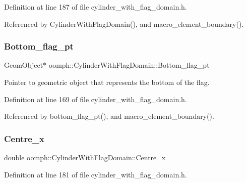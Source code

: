 Definition at line 187 of file cylinder\+\_\+with\+\_\+flag\+\_\+domain.\+h.



Referenced by Cylinder\+With\+Flag\+Domain(), and macro\+\_\+element\+\_\+boundary().

\mbox{\label{classoomph_1_1CylinderWithFlagDomain_ae4bfb961e03aab16d01fc4662c0214e3}} 
\subsubsection{\texorpdfstring{Bottom\+\_\+flag\+\_\+pt}{Bottom\_flag\_pt}}
{\footnotesize\ttfamily Geom\+Object$\ast$ oomph\+::\+Cylinder\+With\+Flag\+Domain\+::\+Bottom\+\_\+flag\+\_\+pt\hspace{0.3cm}{\ttfamily [private]}}



Pointer to geometric object that represents the bottom of the flag. 



Definition at line 169 of file cylinder\+\_\+with\+\_\+flag\+\_\+domain.\+h.



Referenced by bottom\+\_\+flag\+\_\+pt(), and macro\+\_\+element\+\_\+boundary().

\mbox{\label{classoomph_1_1CylinderWithFlagDomain_a9473fc0eb249a20c8a3456c708c8ba6f}} 
\subsubsection{\texorpdfstring{Centre\+\_\+x}{Centre\_x}}
{\footnotesize\ttfamily double oomph\+::\+Cylinder\+With\+Flag\+Domain\+::\+Centre\+\_\+x\hspace{0.3cm}{\ttfamily [private]}}



Definition at line 181 of file cylinder\+\_\+with\+\_\+flag\+\_\+domain.\+h.



